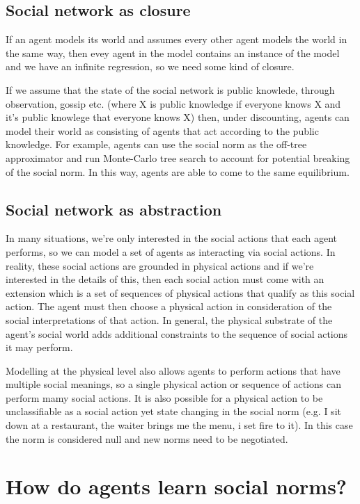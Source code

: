 \documentclass[a4paper]{article}
\begin{document}
\subsection{Social network as closure}

If an agent models its world and assumes every other agent models the world in the same way, then evey agent in the model contains an instance of the model and we have an infinite regression, so we need some kind of closure.

If we assume that the state of the social network is public knowlede, through observation, gossip etc. (where X is public knowledge if everyone knows X and it's public knowlege that everyone knows X) then, under discounting, agents can model their world as consisting of agents that act according to the public knowledge. For example, agents can use the social norm as the off-tree approximator and run Monte-Carlo tree search to account for potential breaking of the social norm. In this way, agents are able to come to the same equilibrium.



\subsection{Social network as abstraction}

In many situations, we're only interested in the social actions that each agent performs, so we can model a set of agents as interacting via social actions. In reality, these social actions are grounded in physical actions and if we're interested in the details of this, then each social action must come with an extension which is a set of sequences of physical actions that qualify as this social action. The agent must then choose a physical action in consideration of the social interpretations of that action. In general, the physical substrate of the agent's social world adds additional constraints to the sequence of social actions it may perform.

Modelling at the physical level also allows agents to perform actions that have multiple social meanings, so a single physical action or sequence of actions can perform mamy social actions. It is also possible for a physical action to be unclassifiable as a social action yet state changing in the social norm (e.g. I sit down at a restaurant, the waiter brings me the menu, i set fire to it). In this case the norm is considered null and new norms need to be negotiated.

\section{How do agents learn social norms?}
\end{document}

